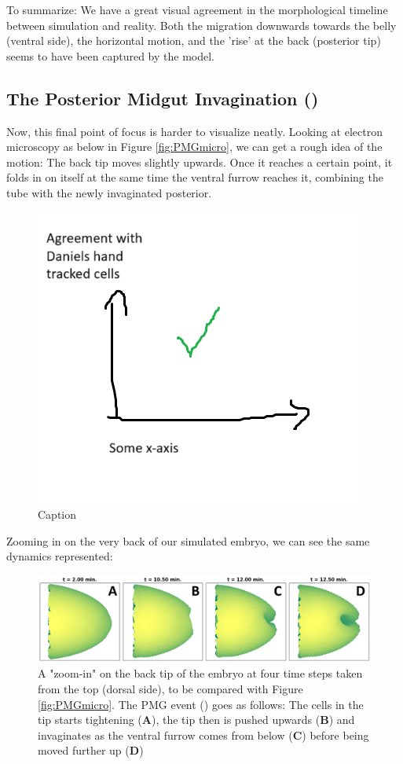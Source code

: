 To summarize: We have a great visual agreement in the morphological timeline between simulation and reality. Both the migration downwards towards the belly (ventral side), the horizontal motion, and the 'rise' at the back (posterior tip) seems to have been captured by the model.
\subsection{The Posterior Midgut Invagination ()}
Now, this final point of focus is harder to visualize neatly. Looking at electron microscopy as below in Figure \ref{fig:PMGmicro}, we can get a rough idea of the motion:
The back tip moves slightly upwards. Once it reaches a certain point, it folds in on itself at the same time the ventral furrow reaches it, combining the tube with the newly invaginated posterior.

\begin{figure}[H]
    \centering
    \includegraphics[width=0.5\linewidth]{chapters/Results/figures/daniel_placeholder.png}
    \caption{Caption}
    \label{fig:PMG in}
\end{figure}
Zooming in on the very back of our simulated embryo, we can see the same dynamics represented:
\begin{figure}[H]
    \centering
    \includegraphics[width=1.\linewidth]{chapters/Results/figures/VisualPMG.png}
    \caption{A "zoom-in" on the back tip of the embryo at four time steps taken from the top (dorsal side), to be compared with Figure \ref{fig:PMGmicro}. The PMG event () goes as follows: The cells in the tip starts tightening (\textbf{A}), the tip then is pushed upwards (\textbf{B}) and invaginates as the ventral furrow comes from below (\textbf{C}) before being moved further up (\textbf{D}) }
    \label{fig:enter-label}
\end{figure}

